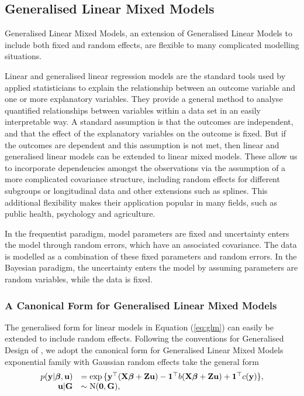 \subsection{Generalised Linear Mixed Models}

Generalised Linear Mixed Models, an extension of Generalised Linear Models to
include both fixed and random effects, are flexible to many complicated
modelling situations.

Linear and generalised linear regression models are the standard tools used by
applied statisticians to explain the relationship between an outcome variable
and one or more explanatory variables. They provide a general method  to analyse
quantified relationships between variables within a data set in an easily
interpretable way. A standard assumption is that the outcomes are independent,
and that the effect of the explanatory variables on the outcome is fixed. But if
the outcomes are dependent and this assumption is not met, then linear and
generalised linear models can be extended to linear mixed models. These allow us
to incorporate dependencies amongst the  observations via the assumption of a
more complicated covariance structure, including random effects for  different
subgroups or longitudinal data and other extensions such as splines. This
additional flexibility makes their application popular in many fields, such as
public health, psychology and agriculture.

In the frequentist paradigm, model parameters are fixed and uncertainty enters
the model through random errors, which have an associated covariance. The data
is modelled as a combination of these fixed parameters and random errors. In the
Bayesian paradigm, the uncertainty enters the model by assuming parameters are
random variables, while the data is fixed.

\subsubsection{A Canonical Form for Generalised Linear Mixed Models}

The generalised form for linear models in Equation (\ref{eq:glm}) can easily be
extended to include random effects.  Following the conventions for Generalised
Design of \citep{Zhao2006}, we adopt the canonical form for Generalised Linear
Mixed Models exponential family with Gaussian random effects take the general
form
$$
\begin{array}{rl}\label{eq:glmm}
	p({\bf y} | {\boldsymbol \beta}, {\bf u}) &= \exp{\{ {\bf y}^\top ({\bf X}{\boldsymbol\beta}+ {\bf Z}{\bf u}) - {\bf1}^\top b({\bf X}{\boldsymbol\beta}+ {\bf Z}{\bf u}) + {\bf1}^\top c({\bf y}) \}}, \\
	{\bf u} | {\bf G} &\sim \text{N}({\bf 0}, {\bf G}),
\end{array}
$$

